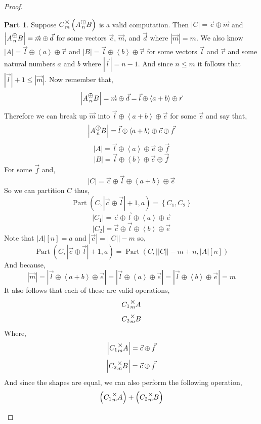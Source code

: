\documentclass[12pt]{book}
\theoremstyle{plain}
\theoremstyle{definition}
\theoremstyle{ppart}
\newtheorem{ppart}{Part}
\theoremstyle{case}
\theoremstyle{solution}
\DeclareMathOperator{\Part}{Part}
\newcommand{\mmult}[1]{\text{\raisebox{1ex}{$\underset{#1}{\times}$}}}
\newcommand{\mconcat}[1]{\text{\raisebox{1ex}{$\underset{#1}{\oplus}$}}}
\newcommand{\shape}[1]{\left|#1\right|}
\begin{document}
\begin{landscape}
\begin{proof}
\begin{ppart}
Suppose $C \mmult{m} \left(A \mconcat{n} B\right)$ is a valid computation.
Then $\shape{C} = \vec{c} \oplus \vec{m}$ and $\shape{A \mconcat{n} B} = \vec{m} \oplus \vec{d}$ for
some vectors $\vec{c}$, $\vec{m}$, and $\vec{d}$ where $\shape{\vec{m}} = m$.
We also know $\shape{A} = \vec{l} \oplus \left< a \right> \oplus \vec{r}$ and
$\shape{B} = \vec{l} \oplus \left< b \right> \oplus \vec{r}$
for some vectors $\vec{l}$ and  $\vec{r}$ and some natural numbers $a$ and $b$ where
$\shape{\vec{l}} = n-1$.
And since $n \le m$ it follows that $\shape{\vec{l}}+1 \le \shape{\vec{m}}$.
Now remember that,
\[ \shape{A \mconcat{n} B} = \vec{m} \oplus \vec{d} = \vec{l} \oplus \left< a+b \right> \oplus \vec{r} \]
Therefore we can break up $\vec{m}$ into $\vec{l} \oplus \left< a+b \right> \oplus \vec{e}$ for some
$\vec{e}$ and say that,
\[ \shape{A \mconcat{n} B} = \vec{l} \oplus \left< a+b \right> \oplus \vec{e} \oplus \vec{f} \]
\[ \shape{A} = \vec{l} \oplus \left< a \right> \oplus \vec{e} \oplus \vec{f} \]
\[ \shape{B} = \vec{l} \oplus \left< b \right> \oplus \vec{e} \oplus \vec{f} \]
For some $\vec{f}$ and,
\[ \shape{C} = \vec{c} \oplus \vec{l} \oplus \left< a+b \right> \oplus \vec{e} \]
So we can partition $C$ thus,
\[ \Part(C, \shape{\vec{c} \oplus \vec{l}}+1, a) = \left\{ C_1, C_2 \right\} \]
\[ \shape{C_1} = \vec{c} \oplus \vec{l} \oplus \left< a \right> \oplus \vec{e} \]
\[ \shape{C_2} = \vec{c} \oplus \vec{l} \oplus \left< b \right> \oplus \vec{e} \]
Note that $\shape{A}[n] = a$ and $\shape{\vec{c}} = \shape{\shape{C}}-m$ so,
\[ \Part(C, \shape{\vec{c} \oplus \vec{l}}+1, a) = \Part(C, \shape{\shape{C}}-m+n, \shape{A}[n]) \]
And because,
\[ \shape{\vec{m}} = \shape{\vec{l} \oplus \left< a+b \right> \oplus \vec{e}} =
   \shape{\vec{l} \oplus \left< a \right> \oplus \vec{e}} = \shape{\vec{l} \oplus \left< b \right> \oplus \vec{e}} = m \]
It also follows that each of these are valid operations,
\[ C_1 \mmult{m} A \]
\[ C_2 \mmult{m} B \]
Where,
\[ \shape{C_1 \mmult{m} A} = \vec{c} \oplus \vec{f} \]
\[ \shape{C_2 \mmult{m} B} = \vec{c} \oplus \vec{f} \]
And since the shapes are equal, we can also perform the following operation,
\[ \left(C_1 \mmult{m} A\right) + \left(C_2 \mmult{m} B\right) \]
\end{ppart}


\end{proof}
\end{landscape}
\end{document}
